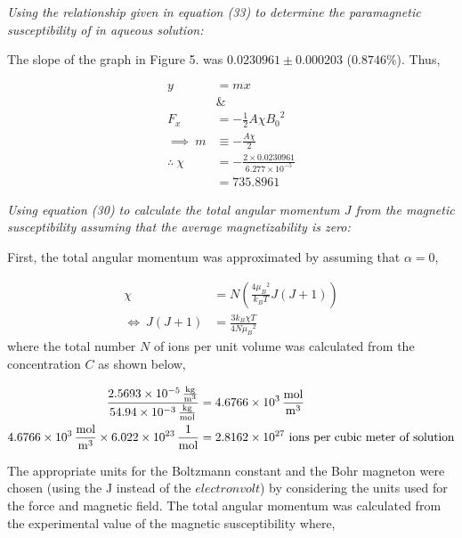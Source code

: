 \documentclass[a4paper,11pt]{article}
\begin{document}
\begin{center}
\textit{Using the relationship given in equation (33) to determine the paramagnetic susceptibility of  in aqueous solution:}
\end{center}

The slope of the graph in Figure 5. was $0.0230961 \pm 0.000203$ ($0.8746\%$). Thus,

\begin{align}
y	& = mx\nonumber\\
	& \&\nonumber\\
F_x	& = -\frac{1}{2} A \chi {B_0}^2\nonumber\\
\implies~m	& \equiv -\frac{A \chi}{2} \nonumber\\
\therefore~\chi	& = -\frac{2 \times 0.0230961}{6.277 \times 10^{-5}}\nonumber\\
				& = 735.8961
\end{align} 

\begin{center}
\textit{Using equation (30) to calculate the total angular momentum $J$ from the magnetic susceptibility assuming that the average magnetizability is zero:}
\end{center}

First, the total angular momentum was approximated by assuming that $\alpha = 0$, 

\begin{align}
\chi	& = N \left( \frac{4 {\mu_B}^2}{k_B T} J(J+1)\right)\nonumber\\
\iff~J(J+1)	& = \frac{3 k_B \chi T}{4 N {\mu_B}^2}\nonumber
\end{align}
where the total number $N$ of  ions per unit volume was calculated from the concentration $C$ as shown below,

\begin{align}
\frac{\SI{2.5693d-5}{\kilogram\per\cubic\meter}}{\SI{54.94d-3}{\kilogram\per\mole}}	& = \SI{4.6766d3}{\mole\per\cubic\meter}\nonumber\\
\SI{4.6766d3}{\mol\per\cubic\meter} \times \SI{6.022d23}{\per\mole}					& = 2.8162 \times 10^{27}~\text{ions per cubic meter of solution}\nonumber\\
\end{align}

The appropriate units for the Boltzmann constant and the Bohr magneton were chosen (using the $\si{\joule}$ instead of the $\si{electronvolt}$) by considering the units used for the force and magnetic field. The total angular momentum was calculated from the experimental value of the magnetic susceptibility where,
\end{document}
